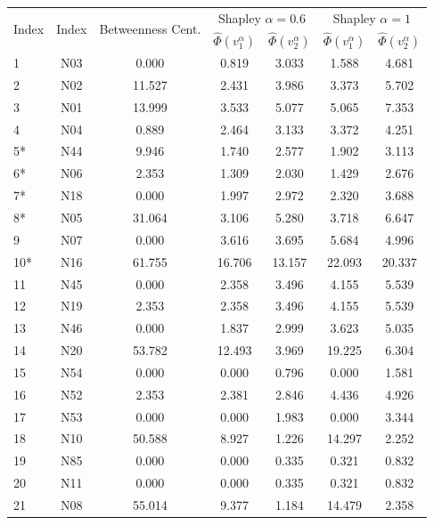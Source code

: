 \documentclass[10p]{article}
\theoremstyle{definition}
\theoremstyle{definition}
\begin{document}
\begin{appendices}
\begin{table}[!ht]\centering
\begin{tabular}{lcccccc}
\toprule
\multirow{2}[3]{*}{Index} & \multirow{2}[3]{*}{\cite{mancuso2014not} Index} &  \multirow{2}[3]{*}{Betweenness Cent.} &\multicolumn{2}{c}{Shapley $\alpha = 0.6$} & \multicolumn{2}{c}{Shapley $\alpha = 1$} \\
\cmidrule(lr){4-5} \cmidrule(lr){6-7}
 & & & $\hat{\Phi}(v_1^\alpha)$ & $\hat{\Phi}(v_2^\alpha)$ & $\hat{\Phi}(v_1^\alpha)$ & $\hat{\Phi}(v_2^\alpha)$ \\
\midrule
1 & N03 & 0.000 &  0.819 &3.033 &  1.588 & 4.681\\ 
 \hline
 2 & N02 & 11.527 & 2.431 &3.986 & 3.373 &5.702 \\
 \hline
 3 & N01 & 13.999 & 3.533 &5.077 & 5.065 &7.353 \\
 \hline
 4 & N04 & 0.889 & 2.464&3.133 & 3.372& 4.251\\
 \hline
 5* & N44 & 9.946 & 1.740&2.577 &1.902 & 3.113\\
 \hline
 6* & N06 & 2.353 &1.309 & 2.030&1.429 & 2.676\\ 
 \hline
 7* & N18 & 0.000 & 1.997&2.972 & 2.320 &3.688 \\
 \hline
 8* & N05 & 31.064 & 3.106  &5.280 &3.718 & 6.647\\
 \hline
 9 & N07 & 0.000 & 3.616 & 3.695& 5.684 & 4.996\\
 \hline
 10* & N16 & 61.755 & 16.706 &13.157 & 22.093&20.337 \\
 \hline
 11 & N45 & 0.000 & 2.358 & 3.496& 4.155 & 5.539 \\ 
 \hline
 12 & N19 & 2.353 &2.358  & 3.496& 4.155& 5.539\\
 \hline
 13 & N46 & 0.000 & 1.837 &2.999 & 3.623 & 5.035\\
 \hline
 14 & N20 & 53.782 &12.493 & 3.969& 19.225 &6.304\\
 \hline
 15 & N54 & 0.000 & 0.000 &0.796 & 0.000 & 1.581\\
 \hline
 16 & N52 & 2.353 & 2.381&2.846 & 4.436  &4.926 \\ 
 \hline
 17 & N53 & 0.000 & 0.000& 1.983& 0.000& 3.344\\
 \hline
 18 &  N10 & 50.588 & 8.927  &1.226 & 14.297 &2.252 \\
 \hline
 19 & N85 & 0.000 & 0.000  &0.335 & 0.321&0.832  \\
 \hline
 20 & N11 & 0.000 &0.000  & 0.335& 0.321& 0.832\\
 \hline
 21 & N08 & 55.014 & 9.377& 1.184& 14.479& 2.358\\

\end{tabular}
\end{table}
\end{appendices}
\end{document}
